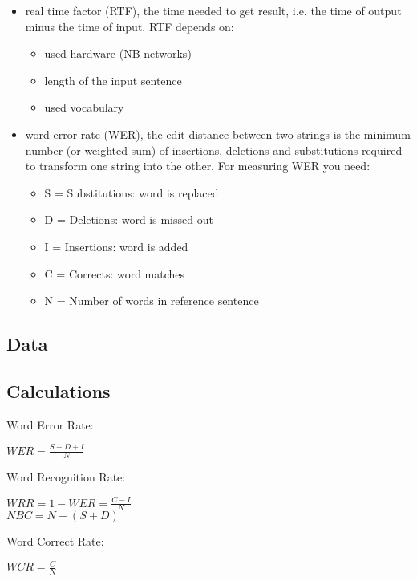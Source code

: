 \documentclass{article}
\begin{document}
\begin{itemize}
    \item real time factor (RTF), the time needed to get result, i.e. the time of output minus the time of input. RTF depends on:
    \begin{itemize}
        \item used hardware (NB networks)
        \item length of the input sentence
        \item used vocabulary
    \end{itemize}
    \item word error rate (WER), the edit distance between two strings is the minimum number (or weighted sum) of insertions, deletions and substitutions required to transform one string into the other. For measuring WER you need:
    \begin{itemize}
        \item S = Substitutions: word is replaced
        \item D = Deletions: word is missed out
        \item I = Insertions: word is added
        \item C = Corrects: word matches
        \item N = Number of words in reference sentence
    \end{itemize}
\end{itemize}


\subsection{Data}
\subsection{Calculations}
    
    Word Error Rate: 
    \begin{center}
    $ WER = \frac{S + D + I}{N}$ \\
    \end{center} 
    
    Word Recognition Rate: 
    \begin{center}
    $ WRR = 1 - WER = \frac{C - I}{N}$ \\
    $ NBC =N - (S + D)$ \\
    \end{center} 
    
    Word Correct Rate: 
    \begin{center}
    $ WCR = \frac{C}{N}$ \\
    \end{center} 
    
\end{document}
